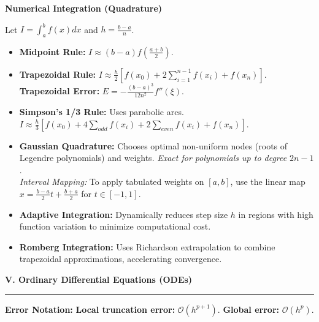 \documentclass[10pt, landscape, twocolumn]{article}
\newcommand{\cheatsheetsection}[1]{
    \vspace{0.6em}
    {\color{themeblue}\large\bfseries #1} \par
    \vspace{-0.5em}
    {\color{themeblue}\rule{\linewidth}{1pt}} \par
    \vspace{0.2em}
}
\newcommand{\cheatsheetsubsection}[1]{
    \vspace{0.4em}
    {\color{themeblue}\normalsize\bfseries #1} \par
    \vspace{0.1em}
}
\begin{document}
\cheatsheetsubsection{Numerical Integration (Quadrature)}
Let $I = \int_a^b f(x)dx$ and $h = \frac{b-a}{n}$.
\begin{itemize}[leftmargin=*, nosep]
    \item \textbf{Midpoint Rule:} $I \approx (b-a) f(\frac{a+b}{2})$.
    \item \textbf{Trapezoidal Rule:} $I \approx \frac{h}{2} [f(x_0) + 2\sum_{i=1}^{n-1} f(x_i) + f(x_n)]$. \\
    \textbf{Trapezoidal Error:} $E = -\frac{(b-a)^3}{12n^2} f''(\xi)$.
    \item \textbf{Simpson's 1/3 Rule:} Uses parabolic arcs.
    $I \approx \frac{h}{3} [f(x_0) + 4\sum_{odd} f(x_i) + 2\sum_{even} f(x_i) + f(x_n)]$.
    \item \textbf{Gaussian Quadrature:} Chooses optimal non-uniform nodes (roots of Legendre polynomials) and weights. \textit{Exact for polynomials up to degree } $2n-1$. \\
    \textit{Interval Mapping:} To apply tabulated weights on $[a,b]$, use the linear map $x = \frac{b-a}{2}t + \frac{b+a}{2}$ for $t \in [-1,1]$.
    \item \textbf{Adaptive Integration:} Dynamically reduces step size $h$ in regions with high function variation to minimize computational cost.
    \item \textbf{Romberg Integration:} Uses Richardson extrapolation to combine trapezoidal approximations, accelerating convergence.
\end{itemize}

\cheatsheetsection{V. Ordinary Differential Equations (ODEs)}
\textbf{Error Notation:} \textbf{Local truncation error:} $\mathcal{O}(h^{p+1})$. \textbf{Global error:} $\mathcal{O}(h^p)$.
\end{document}
